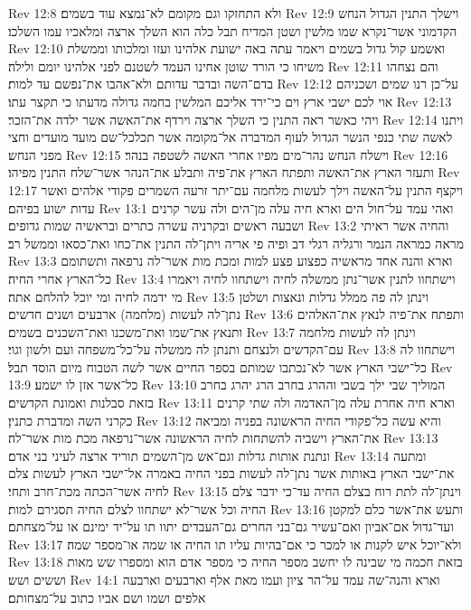 Rev 12:8  ולא התחזקו וגם מקומם לא־נמצא עוד בשמים׃
Rev 12:9  וישלך התנין הגדול הנחש הקדמוני אשר־נקרא שמו מלשין ושטן המדיח תבל כלה הוא השלך ארצה ומלאכיו עמו השלכו׃
Rev 12:10  ואשמע קול גדול בשמים ויאמר עתה באה ישועת אלהינו ועזו ומלכותו וממשלת משיחו כי הורד שוטן אחינו העמד לשטנם לפני אלהינו יומם ולילה׃
Rev 12:11  והם נצחהו בדם־השה ובדבר עדותם ולא־אהבו את־נפשם עד למות׃
Rev 12:12  על־כן רנו שמים ושכניהם אוי לכם ישבי ארץ וים כי־ירד אליכם המלשין בחמה גדולה מדעתו כי תקצר עתו׃
Rev 12:13  ויהי כאשר ראה התנין כי השלך ארצה וירדף את־האשה אשר ילדה את־הזכר׃
Rev 12:14  ויתנו לאשה שתי כנפי הנשר הגדול לעוף המדברה אל־מקומה אשר תכלכל־שם מועד מועדים וחצי מפני הנחש׃
Rev 12:15  וישלח הנחש נהר־מים מפיו אחרי האשה לשטפה בנהר׃
Rev 12:16  ותעזר הארץ את־האשה ותפתח הארץ את־פיה ותבלע את־הנהר אשר־שלח התנין מפיהו׃
Rev 12:17  ויקצף התנין על־האשה וילך לעשות מלחמה עם־יתר זרעה השמרים פקודי אלהים ואשר עדות ישוע בפיהם׃
Rev 13:1  ואהי עמד על־חול הים וארא חיה עלה מן־הים ולה עשר קרנים ושבעה ראשים ובקרניה עשרה כתרים ובראשיה שמות גדופים׃
Rev 13:2  והחיה אשר ראיתי מראה כמראה הנמר ורגליה רגלי דב ופיה פי אריה ויתן־לה התנין את־כחו ואת־כסאו וממשל רב׃
Rev 13:3  וארא והנה אחד מראשיה כפצוע פצע למות ומכת מות אשר־לה נרפאה ותשתומם כל־הארץ אחרי החיה׃
Rev 13:4  וישתחוו לתנין אשר־נתן ממשלה לחיה וישתחוו לחיה ויאמרו מי ידמה לחיה ומי יוכל להלחם אתה׃
Rev 13:5  וינתן לה פה ממלל גדלות ונאצות ושלטן נתן־לה לעשות (מלחמה) ארבעים ושנים חדשים׃
Rev 13:6  ותפתח את־פיה לנאץ את־האלהים ותנאץ את־שמו ואת־משכנו ואת־השכנים בשמים׃
Rev 13:7  וינתן לה לעשות מלחמה עם־הקדשים ולנצחם ותנתן לה ממשלה על־כל־משפחה ועם ולשון וגוי׃
Rev 13:8  וישתחוו לה כל־ישבי הארץ אשר לא־נכתבו שמותם בספר החיים אשר לשה הטבוח מיום הוסד תבל׃
Rev 13:9  כל־אשר אזן לו ישמע׃
Rev 13:10  המוליך שבי ילך בשבי וההרג בחרב הרג יהרג בחרב בזאת סבלנות ואמונת הקדשים׃
Rev 13:11  וארא חיה אחרת עלה מן־האדמה ולה שתי קרנים כקרני השה ומדברת כתנין׃
Rev 13:12  והיא עשה כל־פקודי החיה הראשונה בפניה ומביאה את־הארץ וישביה להשתחות לחיה הראשונה אשר־נרפאה מכת מות אשר־לה׃
Rev 13:13  ונתנת אותות גדלות וגם־אש מן־השמים תוריד ארצה לעיני בני אדם׃
Rev 13:14  ומתעה את־ישבי הארץ באותות אשר נתן־לה לעשות בפני החיה באמרה אל־ישבי הארץ לעשות צלם לחיה אשר־הכתה מכת־חרב ותחי׃
Rev 13:15  וינתן־לה לתת רוח בצלם החיה עד־כי ידבר צלם החיה וכל אשר־לא ישתחוו לצלם החיה תסגירם למות׃
Rev 13:16  ותעש את־אשר כלם למקטן ועד־גדול אם־אביון ואם־עשיר גם־בני החרים גם־העבדים יתוו תו על־יד ימינם או על־מצחתם׃
Rev 13:17  ולא־יוכל איש לקנות או למכר כי אם־בהיות עליו תו החיה או שמה או־מספר שמה׃
Rev 13:18  בזאת חכמה מי שבינה לו יחשב מספר החיה כי מספר אדם הוא ומספרו שש מאות וששים ושש׃
Rev 14:1  וארא והנה־שה עמד על־הר ציון ועמו מאת אלף וארבעים וארבעה אלפים ושמו ושם אביו כתוב על־מצחותם׃
